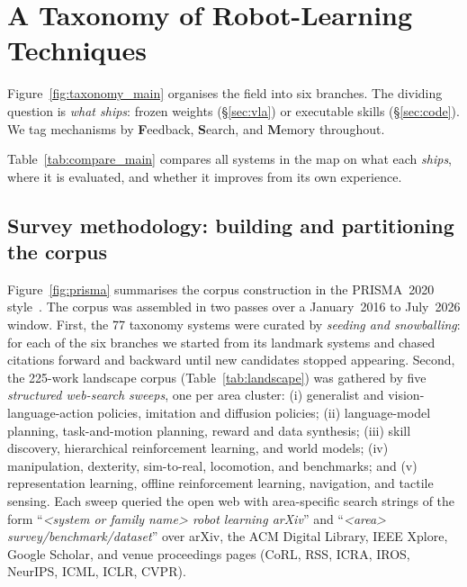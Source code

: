 \section{A Taxonomy of Robot-Learning Techniques}
\label{sec:taxonomy}

Figure~\ref{fig:taxonomy_main} organises the field into six branches. The dividing
question is \emph{what ships}: frozen weights (\S\ref{sec:vla}) or executable skills
(\S\ref{sec:code}). We tag mechanisms by \textbf{F}eedback, \textbf{S}earch, and
\textbf{M}emory throughout.

Table~\ref{tab:compare_main} compares all systems in the map on what each \emph{ships}, where
it is evaluated, and whether it improves from its own experience.


\subsection{Survey methodology: building and partitioning the corpus}
\label{sec:method}

Figure~\ref{fig:prisma} summarises the corpus construction in the PRISMA~2020
style~\citep{prisma2020}. The corpus was assembled in two passes over a January~2016 to
July~2026 window. First, the 77 taxonomy systems were curated by \emph{seeding and
snowballing}: for each of the six branches we started from its landmark systems and chased
citations forward and backward until new candidates stopped appearing. Second, the 225-work
landscape corpus (Table~\ref{tab:landscape}) was gathered by five \emph{structured web-search
sweeps}, one per area cluster: (i) generalist and vision-language-action policies, imitation
and diffusion policies; (ii) language-model planning, task-and-motion planning, reward and data
synthesis; (iii) skill discovery, hierarchical reinforcement learning, and world models;
(iv) manipulation, dexterity, sim-to-real, locomotion, and benchmarks; and (v) representation
learning, offline reinforcement learning, navigation, and tactile sensing. Each sweep queried
the open web with area-specific search strings of the form ``\emph{<system or family name>
robot learning arXiv}'' and ``\emph{<area> survey/benchmark/dataset}'' over arXiv, the ACM
Digital Library, IEEE Xplore, Google Scholar, and venue proceedings pages (CoRL, RSS, ICRA,
IROS, NeurIPS, ICML, ICLR, CVPR).

